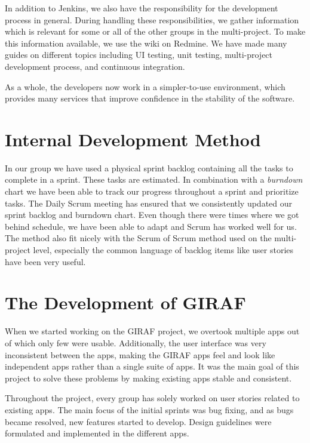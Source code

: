 In addition to Jenkins, we also have the responsibility for the development process in general. During handling these responsibilities, we gather information which is relevant for some or all of the other groups in the multi-project. To make this information available, we use the wiki on Redmine. We have made many guides on different topics including UI testing, unit testing, multi-project development process, and continuous integration.

As a whole, the developers now work in a simpler-to-use environment, which provides many services that improve confidence in the stability of the software.

\section{Internal Development Method}\label{conc:internalprocess}
In our group we have used a physical sprint backlog containing all the tasks to complete in a sprint. These tasks are estimated. In combination with a \emph{burndown} chart we have been able to track our progress throughout a sprint and prioritize tasks. The Daily Scrum meeting has ensured that we consistently updated our sprint backlog and burndown chart. Even though there were times where we got behind schedule, we have been able to adapt and Scrum has worked well for us. The method also fit nicely with the Scrum of Scrum method used on the multi-project level, especially the common language of backlog items like user stories have been very useful.

\section{The Development of GIRAF}\label{conc:multi_project_eval}
When we started working on the GIRAF project, we overtook multiple apps out of which only few were usable. Additionally, the user interface was very inconsistent between the apps, making the GIRAF apps feel and look like independent apps rather than a single suite of apps. It was the main goal of this project to solve these problems by making existing apps stable and consistent.

Throughout the project, every \gui{} group has solely worked on user stories related to existing apps. The main focus of the initial sprints was bug fixing, and as bugs became resolved, new features started to develop. Design guidelines were formulated and implemented in the different apps.

